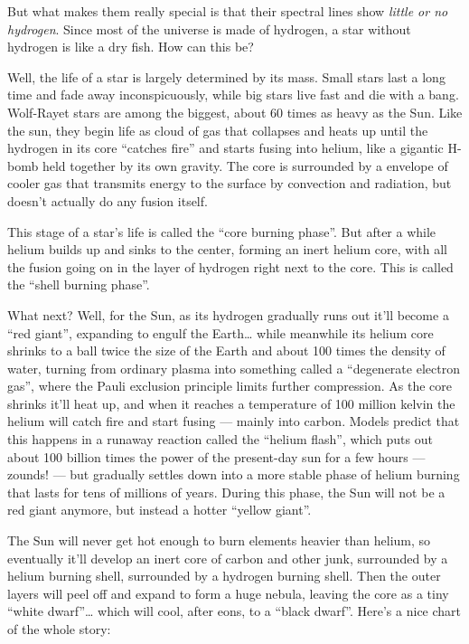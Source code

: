 \documentclass{article}
\def\tightlist{}
\renewcommand{\texttt}[1]{%
  \begingroup
  \ttfamily
  \begingroup\lccode`~=`/\lowercase{\endgroup\def~}{/\discretionary{}{}{}}%
  \begingroup\lccode`~=`[\lowercase{\endgroup\def~}{[\discretionary{}{}{}}%
  \begingroup\lccode`~=`.\lowercase{\endgroup\def~}{.\discretionary{}{}{}}%
  \catcode`/=\active\catcode`[=\active\catcode`.=\active
  \scantokens{#1\noexpand}%
  \endgroup
}
\begin{document}

But what makes them really special is that their spectral lines show
\emph{little or no hydrogen}. Since most of the universe is made of
hydrogen, a star without hydrogen is like a dry fish. How can this be?

Well, the life of a star is largely determined by its mass. Small stars
last a long time and fade away inconspicuously, while big stars live
fast and die with a bang. Wolf-Rayet stars are among the biggest, about
60 times as heavy as the Sun. Like the sun, they begin life as cloud of
gas that collapses and heats up until the hydrogen in its core ``catches
fire'' and starts fusing into helium, like a gigantic H-bomb held
together by its own gravity. The core is surrounded by a envelope of
cooler gas that transmits energy to the surface by convection and
radiation, but doesn't actually do any fusion itself.

This stage of a star's life is called the ``core burning phase''. But
after a while helium builds up and sinks to the center, forming an inert
helium core, with all the fusion going on in the layer of hydrogen right
next to the core. This is called the ``shell burning phase''.

What next? Well, for the Sun, as its hydrogen gradually runs out it'll
become a ``red giant'', expanding to engulf the Earth\ldots{} while
meanwhile its helium core shrinks to a ball twice the size of the Earth
and about 100 times the density of water, turning from ordinary plasma
into something called a ``degenerate electron gas'', where the Pauli
exclusion principle limits further compression. As the core shrinks
it'll heat up, and when it reaches a temperature of 100 million kelvin
the helium will catch fire and start fusing --- mainly into carbon.
Models predict that this happens in a runaway reaction called the
``helium flash'', which puts out about 100 billion times the power of
the present-day sun for a few hours --- zounds! --- but gradually
settles down into a more stable phase of helium burning that lasts for
tens of millions of years. During this phase, the Sun will not be a red
giant anymore, but instead a hotter ``yellow giant''.

The Sun will never get hot enough to burn elements heavier than helium,
so eventually it'll develop an inert core of carbon and other junk,
surrounded by a helium burning shell, surrounded by a hydrogen burning
shell. Then the outer layers will peel off and expand to form a huge
nebula, leaving the core as a tiny ``white dwarf''\ldots{} which will
cool, after eons, to a ``black dwarf''. Here's a nice chart of the whole
story:
\end{document}
